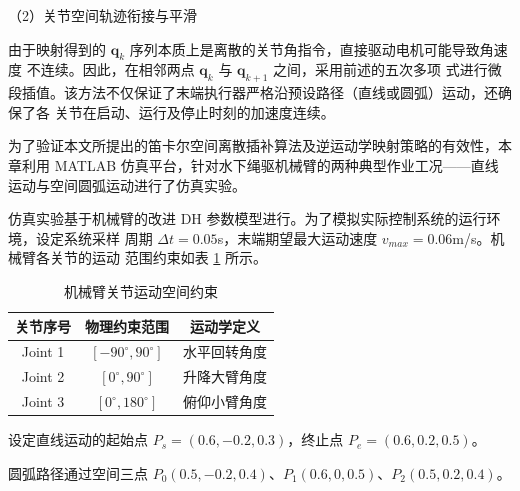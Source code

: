 （2）关节空间轨迹衔接与平滑

由于映射得到的 $\mathbf{q}_k$ 序列本质上是离散的关节角指令，直接驱动电机可能导致角速度
不连续。因此，在相邻两点 $\mathbf{q}_k$ 与 $\mathbf{q}_{k+1}$ 之间，采用前述的五次多项
式进行微段插值。该方法不仅保证了末端执行器严格沿预设路径（直线或圆弧）运动，还确保了各
关节在启动、运行及停止时刻的加速度连续。





为了验证本文所提出的笛卡尔空间离散插补算法及逆运动学映射策略的有效性，本章利用 MATLAB 
仿真平台，针对水下绳驱机械臂的两种典型作业工况——直线运动与空间圆弧运动进行了仿真实验。


仿真实验基于机械臂的改进 DH 参数模型进行。为了模拟实际控制系统的运行环境，设定系统采样
周期 $\Delta t = 0.05$s，末端期望最大运动速度 $v_{max} = 0.06$m/s。机械臂各关节的运动
范围约束如表 \ref{tab:joint_limits} 所示。

\begin{table}[htbp]
    \centering
    \caption{机械臂关节运动空间约束}
    \label{tab:joint_limits}
    \begin{tabular}{ccc}
        \hline
        关节序号 & 物理约束范围 & 运动学定义 \\ \hline
        Joint 1 & $[-90^\circ, 90^\circ]$ & 水平回转角度 \\
        Joint 2 & $[0^\circ, 90^\circ]$ & 升降大臂角度 \\
        Joint 3 & $[0^\circ, 180^\circ]$ & 俯仰小臂角度 \\ \hline
    \end{tabular}
\end{table}


设定直线运动的起始点 $P_s = (0.6, -0.2, 0.3)$，终止点 $P_e = (0.6, 0.2, 0.5)$。

圆弧路径通过空间三点 $P_0(0.5, -0.2, 0.4)$、$P_1(0.6, 0, 0.5)$、$P_2(0.5, 0.2, 0.4)$。



